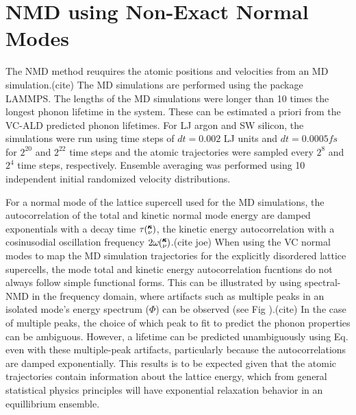 \documentclass[aps,prb,twocolumn,superscriptaddress,amsmath,amssymb,floatfix]{revtex4}
\newcommand{\kv}{\mspace{-4.0mu}\left(\mspace{-8.0mu}
\begin{smallmatrix}&\pmb{\kappa} \\&\nu\end{smallmatrix}
\mspace{-3.0mu}\right)}
\begin{document}

\section{\label{A:NMD XCORR}
NMD using Non-Exact Normal Modes}

The NMD method reuquires the atomic positions and velocities  
from an MD simulation.(cite) 
The MD simulations are performed using the package LAMMPS.
\cite{plimpton_fast_1995} The lengths of the MD simulations were longer 
than 10 times the longest phonon lifetime in the system. These can 
be estimated a priori from the VC-ALD predicted phonon lifetimes. For LJ 
argon and SW silicon, the simulations were run using time steps of 
$dt=0.002$ LJ units and $dt = 0.0005 fs$ for $2^20$ and 
$2^22$ time steps and the atomic trajectories were sampled 
every $2^8$ and $2^4$ time steps, respectively. 
Ensemble averaging was performed using 10 independent initial 
randomized velocity distributions. 

For a normal mode of the lattice supercell 
used for the MD simulations, 
the autocorrelation of the total and kinetic     
normal mode energy are damped exponentials 
with a decay time $\tau\kv$, the kinetic energy autocorrelation with a 
cosinusodial oscillation frequency 
$2\omega\kv$.(cite joe) 
When using the VC normal modes to map the MD simulation 
trajectories for the explicitly disordered lattice supercells, 
the mode total and kinetic energy autocorrelation fucntions 
do not always follow simple functional forms. 
This can be illustrated by using spectral-NMD 
in the frequency domain, where artifacts such as 
multiple peaks in an isolated mode's 
energy spectrum ($\Phi$) can be observed (see Fig ).(cite)  
In the case 
of multiple peaks, the choice of which peak to fit to predict the phonon 
properties can be ambiguous.  However, 
a lifetime can be predicted unambiguously using Eq. even with 
these multiple-peak artifacts, particularly because the autocorrelations 
are damped exponentially. This results is to be expected 
given that the atomic trajectories contain 
information about the lattice energy, which from general statistical 
physics principles will have exponential relaxation behavior in an 
equillibrium ensemble.
\cite{srivastava_physics_1990,landau_statistical_1980,
rajabpour_thermal_2010}
\end{document}
